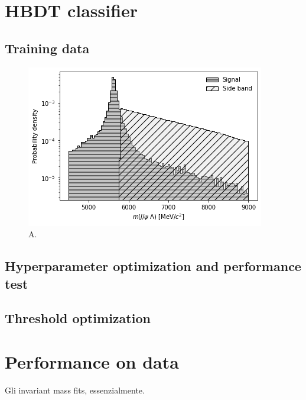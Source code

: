 \section{HBDT classifier}
\label{sec:HBDT}

\subsection{Training data}

\begin{figure}[t]
	\centering
	\includegraphics[width=.6\textwidth]{graphics/04-event_selection/hbdt_signal_sidebands.png}
	\caption{A.}
	\label{fig:4:HBDT_training_data}
\end{figure}

\subsection{Hyperparameter optimization and performance test}

\subsection{Threshold optimization}

\section{Performance on data}
Gli invariant mass fits, essenzialmente.